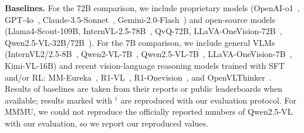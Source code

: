 \documentclass{article}
\begin{document}
\textbf{Baselines.} For the 72B comparison, we include proprietary models (OpenAI-o1~\cite{openai-o1}, GPT-4o~\cite{gpt4o}, Claude-3.5-Sonnet~\cite{claude35}, Gemini-2.0-Flash~\cite{gemini}) and open-source models (Llama4-Scout-109B, InternVL-2.5-78B~\cite{internvl_2_5}, QvQ-72B, LLaVA-OneVision-72B~\cite{llavaov}, Qwen2.5-VL-32B/72B~\cite{qwen2_5_vl}). For the 7B comparison, we include general VLMs (InternVL2/2.5-8B~\cite{internvl_2_5}, Qwen2-VL-7B~\cite{qwen2vl}, Qwen2.5-VL-7B~\cite{qwen2_5_vl}, LLaVA-OneVision-7B~\cite{llavaov}, Kimi-VL-16B) and recent vision-language reasoning models trained with SFT and/or RL: MM-Eureka~\cite{mmeureka}, R1-VL~\cite{r1vl}, R1-Onevision~\cite{R1OneVision}, and OpenVLThinker~\cite{OpenVLThinker}. Results of baselines are taken from their reports or public leaderboards when available; results marked with $^\dagger$ are reproduced with our evaluation protocol. For MMMU, we could not reproduce the officially reported numbers of Qwen2.5-VL with our evaluation, so we report our reproduced values.
\end{document}
